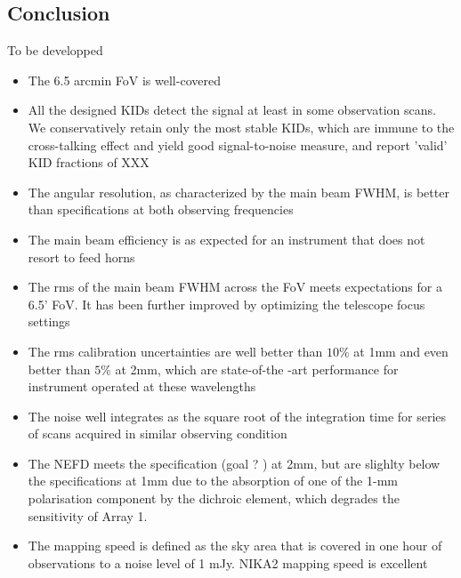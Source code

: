 \subsection*{Conclusion}

{\color{magenta} To be developped}

\begin{itemize}
\item{The 6.5 arcmin FoV is well-covered}
\item{All the designed KIDs detect the signal at least in some observation scans. We conservatively retain only the most stable KIDs, which are immune to the cross-talking effect and yield good signal-to-noise measure, and report 'valid' KID fractions of XXX}
\item{The angular resolution, as characterized by the main beam FWHM, is better than specifications at both observing frequencies}
\item{The main beam efficiency is as expected for an instrument that does not resort to feed horns}
\item{The rms of the main beam FWHM across the FoV meets expectations for a 6.5' FoV. It has been further improved by optimizing the telescope focus settings}
\item{The rms calibration uncertainties are well better than $10\%$ at 1mm and even better than $5\%$ at 2mm, which are state-of-the -art performance for instrument operated at these wavelengths}
\item{The noise well integrates as the square root of the integration time for series of scans acquired in similar observing condition}
\item{The NEFD meets the specification (goal ? ) at 2mm, but are slighlty below the specifications at 1mm due to the absorption of one of the 1-mm polarisation component by the dichroic element, which degrades the sensitivity of Array 1.}
\item{The mapping speed is defined as the sky area that is covered in one hour of observations to a noise level of 1 mJy.  NIKA2 mapping speed is excellent}
\end{itemize}
